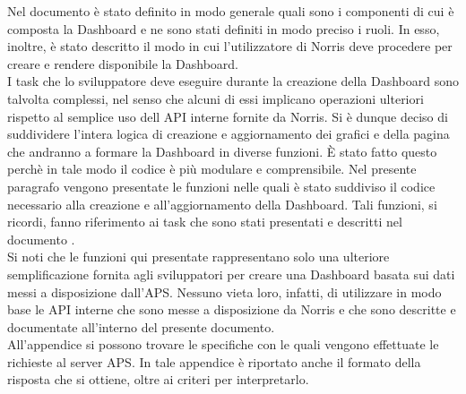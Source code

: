     Nel documento  è stato definito in modo generale quali sono i componenti di cui è composta la Dashboard e ne sono stati definiti in modo preciso i ruoli. In esso, inoltre, è stato descritto il modo in cui l'utilizzatore di Norris deve procedere per creare e rendere disponibile la Dashboard.\\
    I task che lo sviluppatore deve eseguire durante la creazione della Dashboard sono talvolta complessi, nel senso che alcuni di essi implicano operazioni ulteriori rispetto al semplice uso dell API interne fornite da Norris. Si è dunque deciso di suddividere l'intera logica di creazione e aggiornamento dei grafici e della pagina che andranno a formare la Dashboard in diverse funzioni. È stato fatto questo perchè in tale modo il codice è più modulare e comprensibile.
        Nel presente paragrafo vengono presentate le funzioni nelle quali è stato suddiviso il codice necessario alla creazione e all'aggiornamento della Dashboard. Tali funzioni, si ricordi, fanno riferimento ai task che sono stati presentati e descritti nel documento .\\
        Si noti che le funzioni qui presentate rappresentano solo una ulteriore semplificazione fornita agli sviluppatori per creare una Dashboard basata sui dati messi a disposizione dall'APS. Nessuno vieta loro, infatti, di utilizzare in modo base le API interne che sono messe a disposizione da Norris e che sono descritte e documentate all'interno del presente documento.\\
        All'appendice  si possono trovare le specifiche con le quali vengono effettuate le richieste al server APS. In tale appendice è riportato anche il formato della risposta che si ottiene, oltre ai criteri per interpretarlo.

